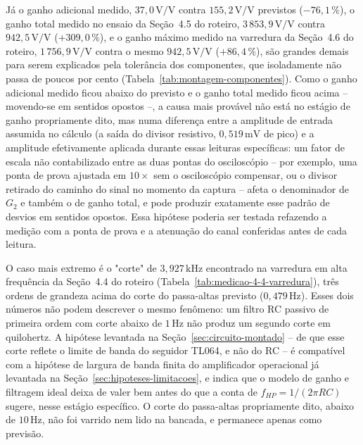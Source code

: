 \documentclass[11pt,a4paper]{article}
\begin{document}
Já o ganho adicional medido, \(37{,}0\,\text{V/V}\) contra \(155{,}2\,\text{V/V}\) previstos (\(-76{,}1\,\%\)), o ganho total medido no ensaio da Seção~4.5 do roteiro, \(3\,853{,}9\,\text{V/V}\) contra \(942{,}5\,\text{V/V}\) (\(+309{,}0\,\%\)), e o ganho máximo medido na varredura da Seção~4.6 do roteiro, \(1\,756{,}9\,\text{V/V}\) contra o mesmo \(942{,}5\,\text{V/V}\) (\(+86{,}4\,\%\)), são grandes demais para serem explicados pela tolerância dos componentes, que isoladamente não passa de poucos por cento (Tabela~\ref{tab:montagem-componentes}). Como o ganho adicional medido ficou abaixo do previsto e o ganho total medido ficou acima -- movendo-se em sentidos opostos --, a causa mais provável não está no estágio de ganho propriamente dito, mas numa diferença entre a amplitude de entrada assumida no cálculo (a saída do divisor resistivo, \(0{,}519\,\text{mV}\) de pico) e a amplitude efetivamente aplicada durante essas leituras específicas: um fator de escala não contabilizado entre as duas pontas do osciloscópio -- por exemplo, uma ponta de prova ajustada em \(10\times\) sem o osciloscópio compensar, ou o divisor retirado do caminho do sinal no momento da captura -- afeta o denominador de \(G_2\) e também o de ganho total, e pode produzir exatamente esse padrão de desvios em sentidos opostos. Essa hipótese poderia ser testada refazendo a medição com a ponta de prova e a atenuação do canal conferidas antes de cada leitura.

O caso mais extremo é o "corte" de \(3{,}927\,\text{kHz}\) encontrado na varredura em alta frequência da Seção~4.4 do roteiro (Tabela~\ref{tab:medicao-4-4-varredura}), três ordens de grandeza acima do corte do passa-altas previsto (\(0{,}479\,\text{Hz}\)). Esses dois números não podem descrever o mesmo fenômeno: um filtro RC passivo de primeira ordem com corte abaixo de \(1\,\text{Hz}\) não produz um segundo corte em quilohertz. A hipótese levantada na Seção~\ref{sec:circuito-montado} -- de que esse corte reflete o limite de banda do seguidor TL064, e não do RC -- é compatível com a hipótese de largura de banda finita do amplificador operacional já levantada na Seção~\ref{sec:hipoteses-limitacoes}, e indica que o modelo de ganho e filtragem ideal deixa de valer bem antes do que a conta de \(f_{HP}=1/(2\pi RC)\) sugere, nesse estágio específico. O corte do passa-altas propriamente dito, abaixo de \(10\,\text{Hz}\), não foi varrido nem lido na bancada, e permanece apenas como previsão.
\end{document}
